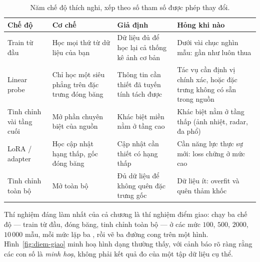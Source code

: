 \documentclass[../../../deep_learning.tex]{subfiles}
\begin{document}
\begin{table}[H]\centering\footnotesize
\caption{Năm chế độ thích nghi, xếp theo số tham số được phép thay đổi.}
\label{tab:nam-che-do}
\begin{tabularx}{\linewidth}{@{}L{2.3cm}YYL{3.3cm}@{}}
\toprule
\textbf{Chế độ} & \textbf{Cơ chế} & \textbf{Giả định} & \textbf{Hỏng khi nào}\\
\midrule
Train từ đầu & Học mọi thứ từ dữ liệu của bạn & Dữ liệu đủ để học lại cả thống kê ảnh cơ bản & Dưới vài chục nghìn mẫu: gần như luôn thua\\
Linear probe & Chỉ học một siêu phẳng trên đặc trưng đóng băng & Thông tin cần thiết đã tuyến tính tách được & Tác vụ cần định vị chính xác, hoặc đặc trưng không có sẵn trong nguồn\\
Tinh chỉnh vài tầng cuối & Mở phần chuyên biệt của nguồn & Khác biệt miền nằm ở tầng cao & Khác biệt nằm ở tầng thấp (ảnh nhiệt, radar, đa phổ)\\
LoRA / adapter & Học cập nhật hạng thấp, gốc đóng băng & Cập nhật cần thiết có hạng thấp & Cần năng lực thực sự mới: loss chững ở mức cao\\
Tinh chỉnh toàn bộ & Mở toàn bộ & Đủ dữ liệu để không quên đặc trưng gốc & Dữ liệu ít: overfit và quên thảm khốc\\
\bottomrule
\end{tabularx}
\end{table}

Thí nghiệm đáng làm nhất của cả chương là thí nghiệm điểm giao: chạy ba chế độ --- train từ đầu, đóng băng, tinh chỉnh toàn bộ --- ở các mức $100$, $500$, $2000$, $10\,000$ mẫu, mỗi mức lặp ba , rồi vẽ ba đường cong trên một hình. Hình~\ref{fig:diem-giao} minh hoạ hình dạng thường thấy, với cảnh báo rõ ràng rằng các con số là \emph{minh hoạ}, không phải kết quả đo của một tập dữ liệu cụ thể.
\end{document}
